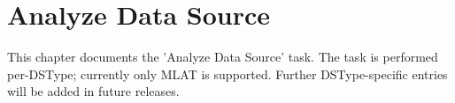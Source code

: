 \chapter{Analyze Data Source}
\label{chap:analyze}

This chapter documents the 'Analyze Data Source' task. The task is performed per-DSType; currently only  MLAT is supported. Further DSType-specific entries will be added in future releases. \\








